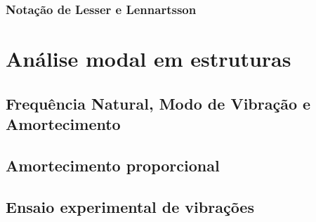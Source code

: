 \subsubsection{Notação de Lesser e Lennartsson}


\section{Análise modal em estruturas}

\subsection{Frequência Natural, Modo de Vibração e Amortecimento}

\subsection{Amortecimento proporcional}

\subsection{Ensaio experimental de vibrações}







